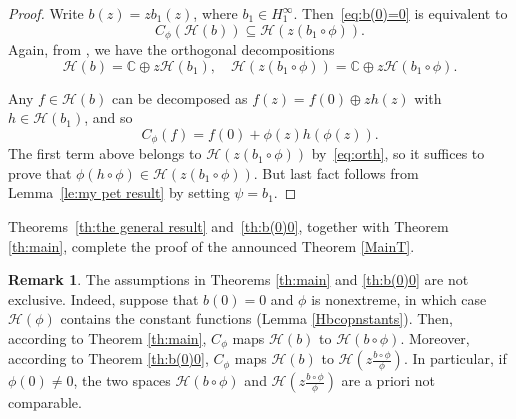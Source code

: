 \documentclass[11pt]{amsart}
\def\C{{\mathbb{C}}}
\def\HH{{\mathcal H}}
\renewcommand{\subset}{\subseteq}
\numberwithin{equation}{section}
\theoremstyle{plain}
\theoremstyle{definition}
\newtheorem{remark}[equation]{Remark}
\begin{document}
\begin{proof}
	Write $b(z)=zb_1(z)$, where $b_1 \in H^{\infty}_{1}$. Then~\eqref{eq:b(0)=0} is equivalent to
\begin{equation}\label{eq:b(0)=0bis}
	C_\phi(\HH(b))\subset \HH\left(z (b_1\circ\phi)\right).
\end{equation}
Again, from \cite[Thm.~18.8]{Hb2-book}, we have the orthogonal decompositions
\begin{equation}\label{eq:orth}
	\HH(b)=\C\oplus z\HH(b_1), \quad \HH\left(z (b_1\circ\phi)\right)=\C\oplus z\HH(b_1\circ\phi).
\end{equation}

Any $f\in\HH(b)$ can be decomposed as $f(z)=f(0)\oplus zh(z)$ with $h\in\HH(b_1)$, and so
\[
C_\phi(f)=f(0)+\phi(z)h(\phi(z)).
\]
The first term above belongs to $\HH(z(b_1\circ\phi))$ by~\eqref{eq:orth}, so it suffices to prove that $\phi (h\circ\phi)\in  \HH(z(b_1\circ\phi))$. But last fact follows from Lemma~\ref{le:my pet result} by setting $\psi =b_1$.	
\end{proof}


Theorems~\ref{th:the general result} and~\ref{th:b(0)0}, together with Theorem \ref{th:main}, complete the proof of the announced Theorem \ref{MainT}.

\begin{remark}
The assumptions in Theorems \ref{th:main} and \ref{th:b(0)0}  are not exclusive. Indeed, suppose that $ b(0)=0 $ and $\phi$ is nonextreme, in which case $ \HH(\phi) $ contains the constant functions (Lemma \ref{Hbcopnstants}). Then, according to Theorem \ref{th:main}, $C_{\phi}$ maps $\HH(b)$ to $\HH(b \circ \phi)$. Moreover, according to 
Theorem \ref{th:b(0)0}, $C_{\phi}$ maps $\HH(b)$ to $\HH(z \frac{b \circ \phi}{\phi}).$ 
In particular, if $\phi(0) \not = 0$, the two spaces $\HH(b \circ \phi)$ and $\HH(z \frac{b \circ \phi}{\phi})$ are a priori not comparable.
\end{remark}
\end{document}
